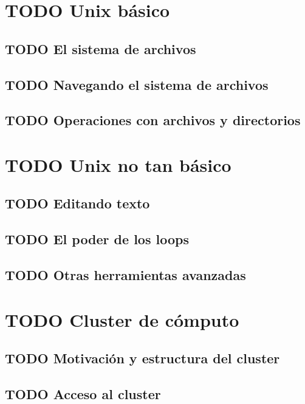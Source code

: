 \documentclass[11pt]{article}
\author{Juan Enciso}
\date{\today}
\title{}
\begin{document}
\tableofcontents

\section{{\bfseries\sffamily TODO} Unix básico}
\label{sec:orgbcf3134}
\subsection{{\bfseries\sffamily TODO} El sistema de archivos}
\label{sec:org7f00cea}
\subsection{{\bfseries\sffamily TODO} Navegando el sistema de archivos}
\label{sec:orgfe1cc9d}
\subsection{{\bfseries\sffamily TODO} Operaciones con archivos y directorios}
\label{sec:org21a0cd5}
\section{{\bfseries\sffamily TODO} Unix no tan básico}
\label{sec:org7d1901d}
\subsection{{\bfseries\sffamily TODO} Editando texto}
\label{sec:orge0d998a}
\subsection{{\bfseries\sffamily TODO} El poder de los loops}
\label{sec:orgc913756}
\subsection{{\bfseries\sffamily TODO} Otras herramientas avanzadas}
\label{sec:org7f0909c}
\section{{\bfseries\sffamily TODO} Cluster de cómputo}
\label{sec:org9a2964f}
\subsection{{\bfseries\sffamily TODO} Motivación y estructura del cluster}
\label{sec:org3a310d5}
\subsection{{\bfseries\sffamily TODO} Acceso al cluster}
\label{sec:org2463bfa}
\end{document}
